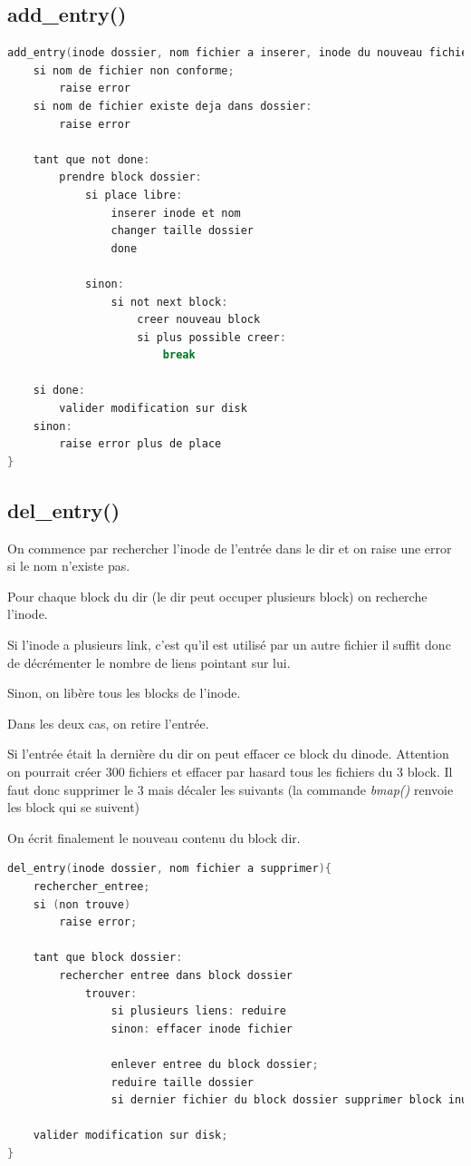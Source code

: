 \documentclass[a4paper,12pt]{article}
\begin{document}
\subsection*{add\_entry()}

\begin{lstlisting}[language=C, caption=pseudo code add\_entry()]
add_entry(inode dossier, nom fichier a inserer, inode du nouveau fichier){
	si nom de fichier non conforme;
		raise error
	si nom de fichier existe deja dans dossier:
		raise error
		
	tant que not done:
		prendre block dossier:
			si place libre:
				inserer inode et nom
				changer taille dossier
				done

			sinon:
				si not next block:
					creer nouveau block
					si plus possible creer:
						break
						
	si done:
		valider modification sur disk
	sinon:
		raise error plus de place
}
\end{lstlisting}

\subsection*{del\_entry()}

On commence par rechercher l'inode de l'entrée dans le dir et on raise une error si le nom n'existe pas.

Pour chaque block du dir (le dir peut occuper plusieurs block) on recherche l'inode.

Si l'inode a plusieurs link, c'est qu'il est utilisé par un autre fichier il suffit donc de décrémenter le nombre de liens pointant sur lui.

Sinon, on libère tous les blocks de l'inode.

Dans les deux cas, on retire l'entrée.

Si l'entrée était la dernière du dir on peut effacer ce block du dinode. Attention on pourrait créer 300 fichiers et effacer par hasard tous les fichiers du 3 block. Il faut donc supprimer le 3 mais décaler les suivants (la commande \emph{bmap()} renvoie les block qui se suivent)

On écrit finalement le nouveau contenu du block dir.

\begin{lstlisting}[language=C, caption=pseudo code del\_entry()]
del_entry(inode dossier, nom fichier a supprimer){
	rechercher_entree;
	si (non trouve)
		raise error;

	tant que block dossier:
		rechercher entree dans block dossier
			trouver:
				si plusieurs liens: reduire
				sinon: effacer inode fichier
			
				enlever entree du block dossier;
				reduire taille dossier
				si dernier fichier du block dossier supprimer block inutile;
	
	valider modification sur disk;
}
\end{lstlisting}
\end{document}
